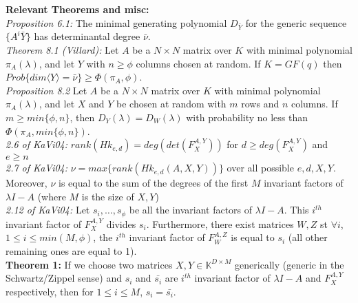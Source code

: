 \documentclass[12pt]{article}
\begin{document}
	
\noindent\textbf{Relevant Theorems and misc:}\\
\noindent\textit{Proposition 6.1:} The minimal generating polynomial $D_{\bar{Y}}$ for the generic
sequence $\{A^i\bar{Y}\}$ has determinantal degree $\bar{\nu}$.\\

\noindent\textit{Theorem 8.1 (Villard):} Let $A$ be a $N \times N$ matrix over $K$ with minimal polynomial $\pi_A(\lambda)$,
and let $Y$ with $n \ge \phi$ columns chosen at random. If $K = GF(q)$ then $Prob\{dim \langle Y \rangle = \bar{\nu} \} \ge
\Phi(\pi_A,\phi)$.\\

\noindent\textit{Proposition 8.2} Let $A$ be a $N \times N$ matrix over $K$ with minimal polynomial $\pi_A(\lambda)$,
and let $X$ and $Y$ be chosen at random with $m$ rows and $n$ columns. If $m \ge min\{\phi,n\}$, then $D_Y(\lambda) = D_W(\lambda)$
with probability no less than $\Phi(\pi_A,min\{\phi,n\})$.\\

\noindent\textit{2.6 of KaVi04:} $rank(Hk_{e,d}) = deg(det(F_X^{A,Y}))$ for $d \ge deg(F_X^{A,Y})$ and $e \ge n$\\

\noindent\textit{2.7 of KaVi04:} $\nu = max\{ rank(Hk_{e,d}(A,X,Y))\}$ over all possible $e,d,X,Y$. Moreover, $\nu$ is equal to the sum of the
degrees of the first $M$ invariant factors of $\lambda I -A$ (where $M$ is the size of $X,Y$)\\

\noindent\textit{2.12 of KaVi04:} Let $s_i,\dots, s_\phi$ be all the invariant factors of $\lambda I - A$. This $i^{th}$ invariant factor of
$F_X^{A,Y}$ divides $s_i$. Furthermore, there exist matrices $W,Z$ st $\forall i$, $1 \le i \le min(M,\phi)$, the $i^{th}$ invariant factor of
$F_W^{A,Z}$ is equal to $s_i$ (all other remaining ones are equal to 1).\\

\noindent\textbf{Theorem 1:} If we choose two matrices 
$X,Y \in \mathbb{K}^{D\times M}$ generically 
(generic in the Schwartz/Zippel sense) and $s_i$ and 
$\bar{s_i}$ are $i^{th}$ invariant factor of 
$\lambda I - A$ and $F_X^{A,Y}$ respectively, then for $1 \le i \le M$,
$s_i = \bar{s_i}$.\\
\end{document}
